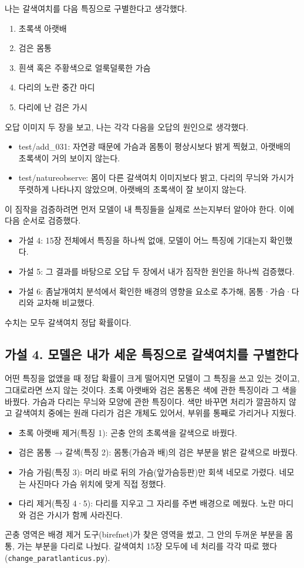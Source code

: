 \documentclass[11pt]{article}
\begin{document}
나는 갈색여치를 다음 특징으로 구별한다고 생각했다.
\begin{enumerate}
\item 초록색 아랫배
\item 검은 몸통
\item 흰색 혹은 주황색으로 얼룩덜룩한 가슴
\item 다리의 노란 중간 마디
\item 다리에 난 검은 가시
\end{enumerate}

오답 이미지 두 장을 보고, 나는 각각 다음을 오답의 원인으로 생각했다.
\begin{itemize}
\item test/add\_031: 자연광 때문에 가슴과 몸통이 평상시보다 밝게 찍혔고, 아랫배의 초록색이 거의 보이지 않는다.
\item test/natureobserve: 몸이 다른 갈색여치 이미지보다 밝고, 다리의 무늬와 가시가 뚜렷하게 나타나지 않았으며, 아랫배의 초록색이 잘 보이지 않는다.
\end{itemize}

이 짐작을 검증하려면 먼저 모델이 내 특징들을 실제로 쓰는지부터 알아야 한다. 이에 다음 순서로 검증했다.
\begin{itemize}
\item 가설 4: 15장 전체에서 특징을 하나씩 없애, 모델이 어느 특징에 기대는지 확인했다.
\item 가설 5: 그 결과를 바탕으로 오답 두 장에서 내가 짐작한 원인을 하나씩 검증했다.
\item 가설 6: 좀날개여치 분석에서 확인한 배경의 영향을 요소로 추가해, 몸통·가슴·다리와 교차해 비교했다.
\end{itemize}
수치는 모두 갈색여치 정답 확률이다.

\subsection*{가설 4. 모델은 내가 세운 특징으로 갈색여치를 구별한다}

어떤 특징을 없앴을 때 정답 확률이 크게 떨어지면 모델이 그 특징을 쓰고 있는 것이고, 그대로라면 쓰지 않는 것이다. 초록 아랫배와 검은 몸통은 색에 관한 특징이라 그 색을 바꿨다. 가슴과 다리는 무늬와 모양에 관한 특징이다. 색만 바꾸면 처리가 깔끔하지 않고 갈색여치 중에는 원래 다리가 검은 개체도 있어서, 부위를 통째로 가리거나 지웠다.
\begin{itemize}
\item 초록 아랫배 제거(특징 1): 곤충 안의 초록색을 갈색으로 바꿨다.
\item 검은 몸통 → 갈색(특징 2): 몸통(가슴과 배)의 검은 부분을 밝은 갈색으로 바꿨다.
\item 가슴 가림(특징 3): 머리 바로 뒤의 가슴(앞가슴등판)만 회색 네모로 가렸다. 네모는 사진마다 가슴 위치에 맞게 직접 정했다.
\item 다리 제거(특징 4·5): 다리를 지우고 그 자리를 주변 배경으로 메웠다. 노란 마디와 검은 가시가 함께 사라진다.
\end{itemize}
곤충 영역은 배경 제거 도구(birefnet)가 찾은 영역을 썼고, 그 안의 두꺼운 부분을 몸통, 가는 부분을 다리로 나눴다. 갈색여치 15장 모두에 네 처리를 각각 따로 했다(\texttt{change\_paratlanticus.py}).
\end{document}
